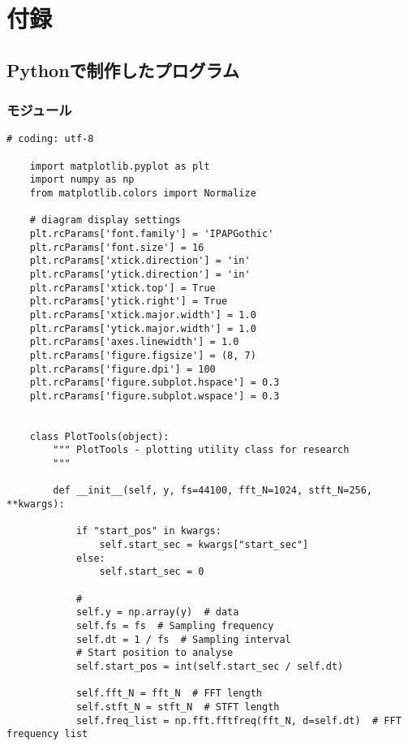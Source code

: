 \appendix

\chapter{付録}

\section{Pythonで制作したプログラム}

\subsection{モジュール}

\begin{lstlisting}[caption=plot\_tools.py,label=plot\_tools.py]
    # coding: utf-8

    import matplotlib.pyplot as plt
    import numpy as np
    from matplotlib.colors import Normalize
    
    # diagram display settings
    plt.rcParams['font.family'] = 'IPAPGothic'
    plt.rcParams['font.size'] = 16
    plt.rcParams['xtick.direction'] = 'in'
    plt.rcParams['ytick.direction'] = 'in'
    plt.rcParams['xtick.top'] = True
    plt.rcParams['ytick.right'] = True
    plt.rcParams['xtick.major.width'] = 1.0
    plt.rcParams['ytick.major.width'] = 1.0
    plt.rcParams['axes.linewidth'] = 1.0
    plt.rcParams['figure.figsize'] = (8, 7)
    plt.rcParams['figure.dpi'] = 100
    plt.rcParams['figure.subplot.hspace'] = 0.3
    plt.rcParams['figure.subplot.wspace'] = 0.3
    
    
    class PlotTools(object):
        """ PlotTools - plotting utility class for research
        """
    
        def __init__(self, y, fs=44100, fft_N=1024, stft_N=256, **kwargs):
    
            if "start_pos" in kwargs:
                self.start_sec = kwargs["start_sec"]
            else:
                self.start_sec = 0
    
            #
            self.y = np.array(y)  # data
            self.fs = fs  # Sampling frequency
            self.dt = 1 / fs  # Sampling interval
            # Start position to analyse
            self.start_pos = int(self.start_sec / self.dt)
    
            self.fft_N = fft_N  # FFT length
            self.stft_N = stft_N  # STFT length
            self.freq_list = np.fft.fftfreq(fft_N, d=self.dt)  # FFT frequency list
    

\end{lstlisting}
